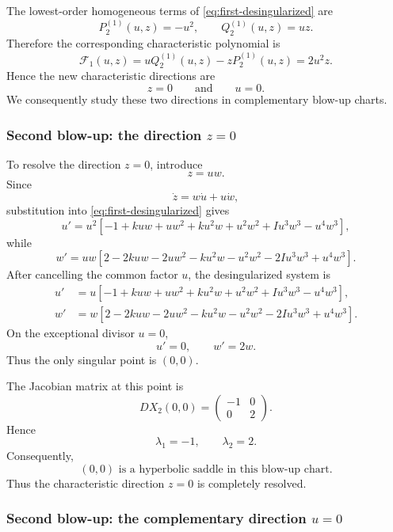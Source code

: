 \documentclass[11pt,reqno]{amsart}
\theoremstyle{plain}
\theoremstyle{definition}
\theoremstyle{remark}
\begin{document}
The lowest-order homogeneous terms of
\eqref{eq:first-desingularized} are
\[
P^{(1)}_2(u,z)=-u^2,
\qquad
Q^{(1)}_2(u,z)=uz.
\]
Therefore the corresponding characteristic polynomial is
\[
\mathcal F_1(u,z)
=
uQ^{(1)}_2(u,z)-zP^{(1)}_2(u,z)
=
2u^2z.
\]
Hence the new characteristic directions are
\[
z=0
\qquad\text{and}\qquad
u=0.
\]
We consequently study these two directions in complementary blow-up
charts.

\subsubsection{Second blow-up: the direction $z=0$}

To resolve the direction $z=0$, introduce
\begin{equation}
\label{eq:second-blowup-chart1}
z=uw.
\end{equation}
Since
\[
\dot z=w\dot u+u\dot w,
\]
substitution into \eqref{eq:first-desingularized} gives
\[
u'
=
u^2
\left[
-1
+kuw
+uw^2
+ku^2w
+u^2w^2
+Iu^3w^3
-u^4w^3
\right],
\]
while
\[
w'
=
uw
\left[
2
-2kuw
-2uw^2
-ku^2w
-u^2w^2
-2Iu^3w^3
+u^4w^3
\right].
\]
After cancelling the common factor $u$, the desingularized system is
\begin{equation}
\label{eq:second-desing-chart1}
\boxed{
\begin{aligned}
u'
&=
u
\left[
-1
+kuw
+uw^2
+ku^2w
+u^2w^2
+Iu^3w^3
-u^4w^3
\right],
\\
w'
&=
w
\left[
2
-2kuw
-2uw^2
-ku^2w
-u^2w^2
-2Iu^3w^3
+u^4w^3
\right].
\end{aligned}}
\end{equation}
On the exceptional divisor $u=0$,
\[
u'=0,
\qquad
w'=2w.
\]
Thus the only singular point is $(0,0)$.

The Jacobian matrix at this point is
\[
D X_2(0,0)
=
\begin{pmatrix}
-1&0\\
0&2
\end{pmatrix}.
\]
Hence
\[
\lambda_1=-1,
\qquad
\lambda_2=2.
\]
Consequently,
\[
\boxed{
(0,0)\text{ is a hyperbolic saddle in this blow-up chart}.
}
\]
Thus the characteristic direction $z=0$ is completely resolved.

\subsubsection{Second blow-up: the complementary direction $u=0$}
\end{document}
